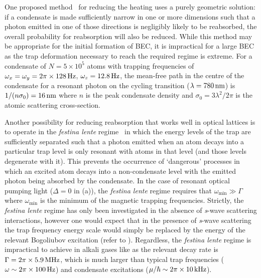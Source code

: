 One proposed method~\citep{Castin:1998,Vengalattore:2003} for reducing the heating uses a purely geometric solution: if a condensate is made sufficiently narrow in one or more dimensions such that a photon emitted in one of those directions is negligibly likely to be reabsorbed, the overall probability for reabsorption will also be reduced.  While this method may be appropriate for the initial formation of BEC, it is impractical for a large BEC as the trap deformation necessary to reach the required regime is extreme.  For a  condensate of $N= 5\times 10^5$ atoms with trapping frequencies of $\omega_x = \omega_y = \unit[2\pi \times 128]{Hz}$, $\omega_z = \unit[12.8]{Hz}$, the mean-free path in the centre of the condensate for a resonant photon on the cycling transition ($\lambda = \unit[780]{nm}$) is $1/(n \sigma_0) = \unit[16]{nm}$ where $n$ is the peak condensate density and $\sigma_0 = 3 \lambda^2/2 \pi$ is the atomic scattering cross-section.

Another possibility for reducing reabsorption that works well in optical lattices is to operate in the \emph{festina lente} regime~\citep{Wolf:2000,Santos:1999qf,Cirac:1996,Castin:1998} in which the energy levels of the trap are sufficiently separated such that a photon emitted when an atom decays into a particular trap level is only resonant with atoms in that level (and those levels degenerate with it).  This prevents the occurrence of `dangerous' processes in which an excited atom decays into a non-condensate level with the emitted photon being absorbed by the condensate.  In the case of resonant optical pumping light ($\Delta = 0$ in (a)), the \emph{festina lente} regime requires that $\omega_\text{min} \gg \Gamma$  where $\omega_\text{min}$ is the minimum of the magnetic trapping frequencies.  Strictly, the \emph{festina lente} regime has only been investigated in the absence of \emph{s}-wave scattering interactions, however one would expect that in the presence of \emph{s}-wave scattering the trap frequency energy scale would simply be replaced by the energy of the relevant Bogoliubov excitation (refer to ).  Regardless, the \emph{festina lente} regime is impractical to achieve in alkali gases like  as the relevant decay rate is $\Gamma = \unit[2\pi\times 5.9]{MHz}$, which is much larger than typical trap frequencies ($\omega \sim \unit[2\pi \times 100]{Hz}$) and condensate excitations ($\mu/\hbar \sim \unit[2\pi \times 10]{kHz}$).

